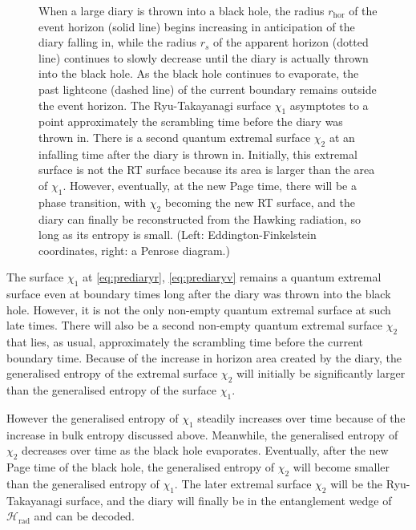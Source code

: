 \documentclass[11pt,a4paper]{article}
\begin{document}
\begin{figure}[t]
\begin{subfigure}{.48\textwidth}
\end{subfigure}
\centering
\caption{When a large diary is thrown into a black hole, the radius $r_\text{hor}$ of the event horizon (solid line) begins increasing in anticipation of the diary falling in, while the radius $r_s$ of the apparent horizon (dotted line) continues to slowly decrease until the diary is actually thrown into the black hole. As the black hole continues to evaporate, the past lightcone (dashed line) of the current boundary remains outside the event horizon. The Ryu-Takayanagi surface $\chi_1$ asymptotes to a point approximately the scrambling time before the diary was thrown in. There is a second quantum extremal surface $\chi_2$ at an infalling time after the diary is thrown in. Initially, this extremal surface is not the RT surface because its area is larger than the area of $\chi_1$. However, eventually, at the new Page time, there will be a phase transition, with $\chi_2$ becoming the new RT surface, and the diary can finally be reconstructed from the Hawking radiation, so long as its entropy is small. (Left: Eddington-Finkelstein coordinates, right: a Penrose diagram.)}
\label{fig:largediary}
\end{figure}

The surface $\chi_1$ at \eqref{eq:prediaryr}, \eqref{eq:prediaryv} remains a quantum extremal surface even at boundary times long after the diary was thrown into the black hole. However, it is not the only non-empty quantum extremal surface at such late times. There will also be a second non-empty quantum extremal surface $\chi_2$ that lies, as usual, approximately the scrambling time before the current boundary time. Because of the increase in horizon area created by the diary, the generalised entropy of the extremal surface $\chi_2$ will initially be significantly larger than the generalised entropy of the surface $\chi_1$.

However the generalised entropy of $\chi_1$ steadily increases over time because of the increase in bulk entropy discussed above. Meanwhile, the generalised entropy of $\chi_2$ decreases over time as the black hole evaporates. Eventually, after the new Page time of the black hole, the generalised entropy of $\chi_2$ will become smaller than the generalised entropy of $\chi_1$. The later extremal surface $\chi_2$ will be the Ryu-Takayanagi surface, and the diary will finally be in the entanglement wedge of $\mathcal{H}_\text{rad}$ and can be decoded.
\end{document}
